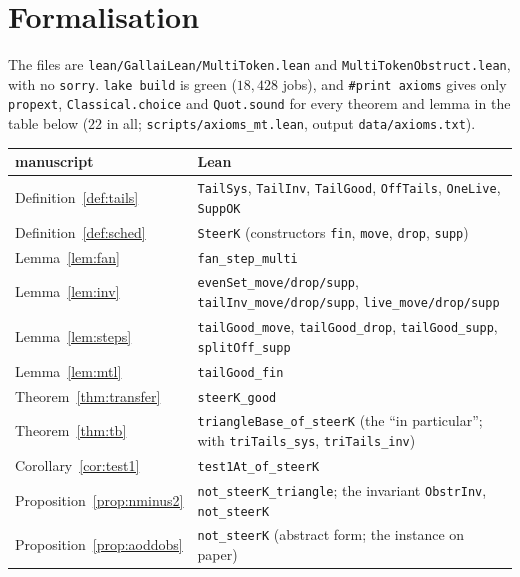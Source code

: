 \documentclass[11pt]{amsart}
\theoremstyle{definition}
\begin{document}
\section{Formalisation}\label{sec:lean}

The files are \texttt{lean/GallaiLean/MultiToken.lean} and \texttt{MultiTokenObstruct.lean}, with no
\texttt{sorry}. \texttt{lake build} is green ($18{,}428$ jobs), and \texttt{\#print axioms} gives only
\texttt{propext}, \texttt{Classical.choice} and \texttt{Quot.sound} for every theorem and lemma in the table below
($22$ in all; \texttt{scripts/axioms\_mt.lean}, output \texttt{data/axioms.txt}).

\begin{center}\small
\begin{tabular}{@{}ll@{}}
\toprule
manuscript & Lean\\
\midrule
Definition~\ref{def:tails} & \texttt{TailSys}, \texttt{TailInv}, \texttt{TailGood},
\texttt{OffTails}, \texttt{OneLive}, \texttt{SuppOK}\\
Definition~\ref{def:sched} & \texttt{SteerK} (constructors \texttt{fin}, \texttt{move},
\texttt{drop}, \texttt{supp})\\
Lemma~\ref{lem:fan} & \texttt{fan\_step\_multi}\\
Lemma~\ref{lem:inv} & \texttt{evenSet\_move/drop/supp}, \texttt{tailInv\_move/drop/supp},
\texttt{live\_move/drop/supp}\\
Lemma~\ref{lem:steps} & \texttt{tailGood\_move}, \texttt{tailGood\_drop}, \texttt{tailGood\_supp},
\texttt{splitOff\_supp}\\
Lemma~\ref{lem:mtl} & \texttt{tailGood\_fin}\\
Theorem~\ref{thm:transfer} & \texttt{steerK\_good}\\
Theorem~\ref{thm:tb} & \texttt{triangleBase\_of\_steerK} (the ``in particular''; with
\texttt{triTails\_sys}, \texttt{triTails\_inv})\\
Corollary~\ref{cor:test1} & \texttt{test1At\_of\_steerK}\\
Proposition~\ref{prop:nminus2} & \texttt{not\_steerK\_triangle}; the invariant \texttt{ObstrInv},
\texttt{not\_steerK}\\
Proposition~\ref{prop:aoddobs} & \texttt{not\_steerK} (abstract form; the instance on paper)\\
\bottomrule
\end{tabular}
\end{center}
\end{document}
